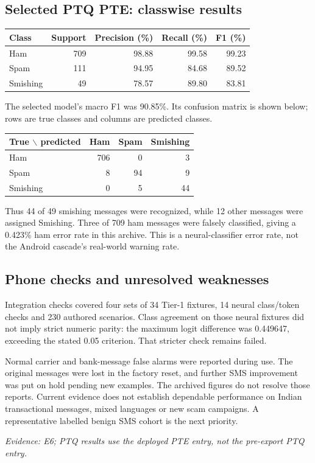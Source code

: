 \documentclass[11pt,a4paper]{article}
\newcommand{\source}[1]{{\small\textit{Evidence: #1.}\par}}
\begin{document}
\subsection*{Selected PTQ PTE: classwise results}
\begin{center}\small
\begin{tabular}{@{}lrrrr@{}}
\toprule Class & Support & Precision (\%) & Recall (\%) & F1 (\%)\\\midrule
Ham & 709 & 98.88 & 99.58 & 99.23 \\
Spam & 111 & 94.95 & 84.68 & 89.52 \\
Smishing & 49 & 78.57 & 89.80 & 83.81 \\
\bottomrule
\end{tabular}
\end{center}
The selected model's macro F1 was 90.85\%. Its confusion matrix is shown below;
rows are true classes and columns are predicted classes.
\begin{center}\small
\begin{tabular}{@{}lrrr@{}}
\toprule True $\backslash$ predicted & Ham & Spam & Smishing\\\midrule
Ham & 706 & 0 & 3\\
Spam & 8 & 94 & 9\\
Smishing & 0 & 5 & 44\\
\bottomrule
\end{tabular}
\end{center}
Thus 44 of 49 smishing messages were recognized, while 12 other messages were assigned
Smishing. Three of 709 ham messages were falsely classified, giving a 0.423\% ham error
rate in this archive. This is a neural-classifier error rate, not the Android cascade's
real-world warning rate.

\subsection*{Phone checks and unresolved weaknesses}
Integration checks covered four sets of 34 Tier-1 fixtures, 14 neural class/token checks
and 230 authored scenarios. Class agreement on those neural fixtures did not imply
strict numeric parity: the maximum logit difference was 0.449647, exceeding the stated
0.05 criterion. That stricter check remains failed.

Normal carrier and bank-message false alarms were reported during use. The original
messages were lost in the factory reset, and further SMS improvement was put on hold
pending new examples. The archived figures do not resolve those reports. Current evidence
does not establish dependable performance on Indian transactional messages, mixed languages
or new scam campaigns. A representative labelled benign SMS cohort is the next priority.
\source{E6; PTQ results use the deployed PTE entry, not the pre-export PTQ entry}
\end{document}
